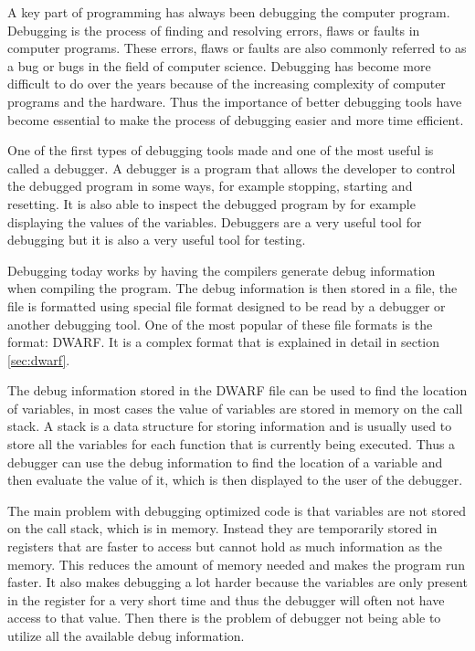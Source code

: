 
A key part of programming has always been debugging the computer program.
Debugging is the process of finding and resolving errors, flaws or faults in computer programs.
These errors, flaws or faults are also commonly referred to as a bug or bugs in the field of computer science.
Debugging has become more difficult to do over the years because of the increasing complexity of computer programs and the hardware.
Thus the importance of better debugging tools have become essential to make the process of debugging easier and more time efficient.


One of the first types of debugging tools made and one of the most useful is called a debugger.
A debugger is a program that allows the developer to control the debugged program in some ways, for example stopping, starting and resetting.
It is also able to inspect the debugged program by for example displaying the values of the variables.
Debuggers are a very useful tool for debugging but it is also a very useful tool for testing.


Debugging today works by having the compilers generate debug information when compiling the program.
The debug information is then stored in a file, the file is formatted using special file format designed to be read by a debugger or another debugging tool.
One of the most popular of these file formats is the format: \gls{DWARF}.
It is a complex format that is explained in detail in section \ref{sec:dwarf}.


The debug information stored in the \gls{DWARF} file can be used to find the location of variables, in most cases the value of variables are stored in memory on the call stack.
A stack is a data structure for storing information and is usually used to store all the variables for each function that is currently being executed.
Thus a debugger can use the debug information to find the location of a variable and then evaluate the value of it, which is then displayed to the user of the debugger.


The main problem with debugging optimized code is that variables are not stored on the call stack, which is in memory.
Instead they are temporarily stored in registers that are faster to access but cannot hold as much information as the memory.
This reduces the amount of memory needed and makes the program run faster.
It also makes debugging a lot harder because the variables are only present in the register for a very short time and thus the debugger will often not have access to that value.
Then there is the problem of debugger not being able to utilize all the available debug information.


